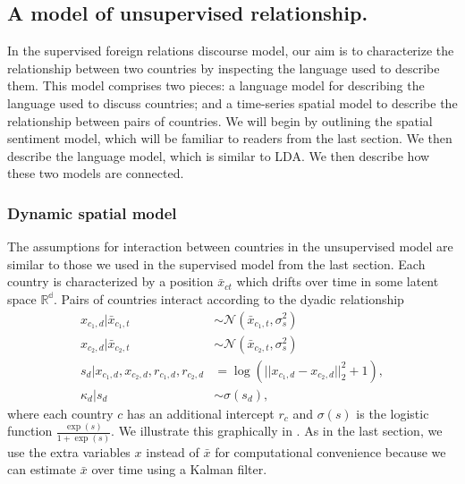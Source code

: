 \subsection{A model of unsupervised relationship.}
In the supervised foreign relations discourse model, our aim is to
characterize the relationship between two countries by inspecting the
language used to describe them.  This model comprises two pieces: a
language model for describing the language used to discuss countries;
and a time-series spatial model to describe the relationship between
pairs of countries.  We will begin by outlining the spatial sentiment
model, which will be familiar to readers from the last section.  We
then describe the language model, which is similar to LDA.  We then
describe how these two models are connected.

\subsubsection*{Dynamic spatial model}
The assumptions for interaction between countries in the unsupervised
model are similar to those we used in the supervised model from the
last section.  Each country is characterized by a position $\bar
x_{ct}$ which drifts over time in some latent space $\mathbb{R^d}$.
Pairs of countries interact according to the dyadic relationship
\begin{align}
  x_{c_1,d} | \bar x_{c_1,t} & \sim \mathcal{N}(\bar x_{c_1, t}, \sigma_s^2) \nonumber \\
  x_{c_2,d} | \bar x_{c_2,t} & \sim \mathcal{N}(\bar x_{c_2, t}, \sigma_s^2) \nonumber \\
  s_d | x_{c_1,d}, x_{c_2,d}, r_{c_1,d}, r_{c_2,d} & = \log( || x_{c_1,d} - x_{c_2,d} ||_2^2 + 1), \nonumber \\
  \kappa_d | s_d & \sim \sigma(s_d),
\end{align}
where each country $c$ has an additional intercept $r_c$ and
$\sigma(s)$ is the logistic function $\frac{\exp(s)}{1 + \exp(s)}$.
We illustrate this graphically in .  As in the
last section, we use the extra variables $x$ instead of $\bar x$ for
computational convenience because we can estimate $\bar x$ over time
using a Kalman filter.

